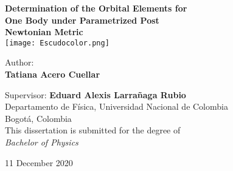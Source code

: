  \begin{titlepage}
    \begin{center}
        \vspace*{0.1cm}
        
        {\Huge \textbf{Determination of the Orbital Elements for}} \\
           \vspace{0.20cm}
         {\Huge \textbf{One Body under Parametrized Post}}\\ 
            \vspace{0.15cm}
         {\Huge \textbf{Newtonian Metric}}\\
        
        \vspace{0.8cm}
        \texttt{[image: Escudocolor.png]}
        
        
         
        \vspace{0.8cm}
        \large Author: \\
        \vspace{0.3cm}
        \textbf{Tatiana Acero Cuellar}\\
        \vspace{1cm}
        
        Supervisor: \textbf{Eduard Alexis Larrañaga Rubio}\\
        
        
        \vspace{1.0cm}
        Departamento de Física, Universidad Nacional de Colombia \\
        Bogotá, Colombia\\
         \vspace{1.0cm}
         This dissertation is submitted for the degree of\\
         \textit{Bachelor of Physics}
        
        
          \vspace{1cm}
        \large  11 December 2020\\
    \end{center}
\end{titlepage}


\hypersetup{linkcolor=black}
 	\tableofcontents
